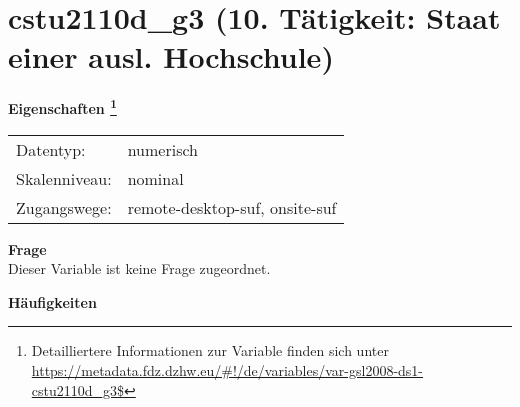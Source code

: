 
    \setcounter{footnote}{0}

    \vspace*{-1.8cm}
	\section{cstu2110d\_g3 (10. Tätigkeit: Staat einer ausl. Hochschule)}
	\label{section:cstu2110d_g3}



    \vspace*{0.5cm}
    \noindent\textbf{Eigenschaften
	\footnote{Detailliertere Informationen zur Variable finden sich unter
		\url{https://metadata.fdz.dzhw.eu/\#!/de/variables/var-gsl2008-ds1-cstu2110d_g3$}}}\\
	\begin{tabularx}{\hsize}{@{}lX}
	Datentyp: & numerisch \\
	Skalenniveau: & nominal \\
	Zugangswege: &
	  remote-desktop-suf, 
	  onsite-suf
 \\
    \end{tabularx}



		\vspace*{0.5cm}
		\noindent\textbf{Frage}\\
		Dieser Variable ist keine Frage zugeordnet.





        		\vspace*{0.5cm}
                \noindent\textbf{Häufigkeiten}

